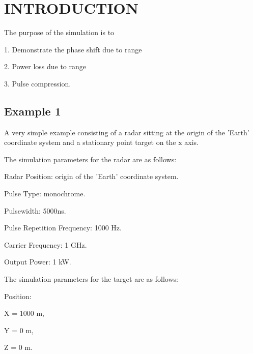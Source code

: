 \documentclass{sebase}
\begin{document}

\section{\protect\smallskip INTRODUCTION}

\smallskip The purpose of the simulation is to

1. Demonstrate the phase shift due to range

2. Power loss due to range

3. Pulse compression.

\smallskip

\subsection{Example 1}

A very simple example consisting of a radar sitting at the origin of the
'Earth' coordinate system and a stationary point target on the x axis.

\smallskip

The simulation parameters for the radar are as follows:

\smallskip

Radar Position: origin of the 'Earth' coordinate system.

\smallskip

Pulse Type: monochrome.

\smallskip

Pulsewidth: 5000ns.

\smallskip

Pulse Repetition Frequency: 1000 Hz.

\smallskip

Carrier Frequency: 1 GHz.

\smallskip

Output Power: 1 kW.

\smallskip

The simulation parameters for the target are as follows:

\smallskip

Position:

\smallskip

X = 1000 m,

\smallskip

Y = 0 m,

\smallskip

Z = 0 m.

\smallskip
\end{document}
